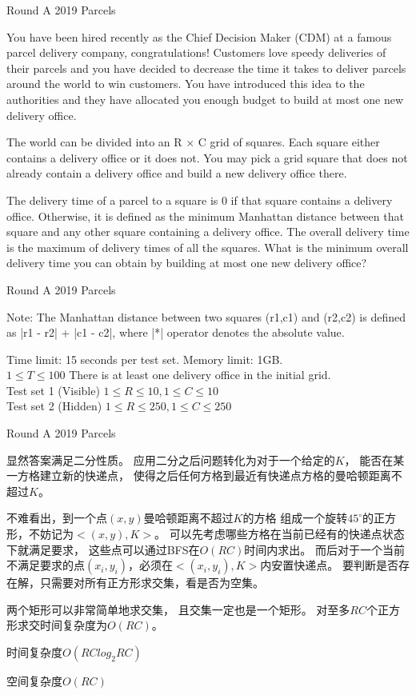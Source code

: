\documentclass{beamer}
\begin{document}
\begin{frame}{Round A 2019 Parcels}

    You have been hired recently as the Chief Decision Maker (CDM) at a famous parcel delivery company, congratulations! Customers love speedy deliveries of their parcels and you have decided to decrease the time it takes to deliver parcels around the world to win customers. You have introduced this idea to the authorities and they have allocated you enough budget to build at most one new delivery office.

    The world can be divided into an R × C grid of squares. Each square either contains a delivery office or it does not. You may pick a grid square that does not already contain a delivery office and build a new delivery office there.
    
    The delivery time of a parcel to a square is 0 if that square contains a delivery office. Otherwise, it is defined as the minimum Manhattan distance between that square and any other square containing a delivery office. The overall delivery time is the maximum of delivery times of all the squares. What is the minimum overall delivery time you can obtain by building at most one new delivery office?
    
\end{frame}

\begin{frame}{Round A 2019 Parcels}
    
    Note: The Manhattan distance between two squares (r1,c1) and (r2,c2) is defined as |r1 - r2| + |c1 - c2|, where |*| operator denotes the absolute value.
    
    Time limit: 15 seconds per test set. Memory limit: 1GB. \\
    $1 \leq T \leq 100$ There is at least one delivery office in the initial grid. \\
    Test set 1 (Visible) $1\leq R\leq 10, 1\leq C\leq 10$\\
    Test set 2 (Hidden) $1\leq R\leq 250, 1\leq C\leq 250$
    
\end{frame}

\begin{frame}{Round A 2019 Parcels}

    显然答案满足二分性质。
    应用二分之后问题转化为对于一个给定的$K$，
    能否在某一方格建立新的快递点，
    使得之后任何方格到最近有快递点方格的曼哈顿距离不超过$K$。
    
    不难看出，到一个点$(x,y)$曼哈顿距离不超过$K$的方格
    组成一个旋转$45^{\circ}$的正方形，不妨记为$<(x,y),K>$。
    可以先考虑哪些方格在当前已经有的快递点状态下就满足要求，
    这些点可以通过BFS在$O(RC)$时间内求出。
    而后对于一个当前不满足要求的点$(x_i,y_i)$，必须在$<(x_i,y_i),K>$内安置快递点。
    要判断是否存在解，只需要对所有正方形求交集，看是否为空集。
    
    两个矩形可以非常简单地求交集，
    且交集一定也是一个矩形。
    对至多$RC$个正方形求交时间复杂度为$O(RC)$。
    
    时间复杂度$O(RClog_2{RC})$
    
    空间复杂度$O(RC)$
    
\end{frame}
\end{document}
